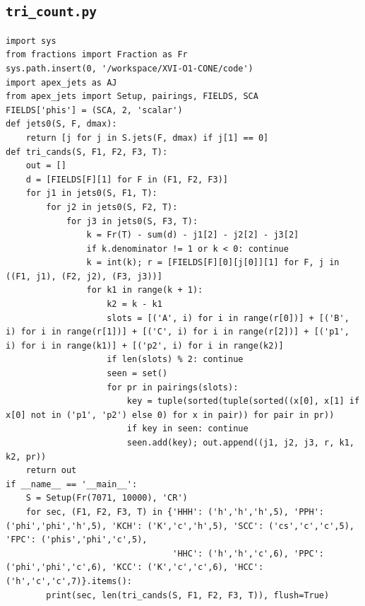 \documentclass[10pt]{article}
\begin{document}
\subsection{\texttt{tri\_count.py}}
\begin{lstlisting}
import sys
from fractions import Fraction as Fr
sys.path.insert(0, '/workspace/XVI-O1-CONE/code')
import apex_jets as AJ
from apex_jets import Setup, pairings, FIELDS, SCA
FIELDS['phis'] = (SCA, 2, 'scalar')
def jets0(S, F, dmax):
    return [j for j in S.jets(F, dmax) if j[1] == 0]
def tri_cands(S, F1, F2, F3, T):
    out = []
    d = [FIELDS[F][1] for F in (F1, F2, F3)]
    for j1 in jets0(S, F1, T):
        for j2 in jets0(S, F2, T):
            for j3 in jets0(S, F3, T):
                k = Fr(T) - sum(d) - j1[2] - j2[2] - j3[2]
                if k.denominator != 1 or k < 0: continue
                k = int(k); r = [FIELDS[F][0][j[0]][1] for F, j in ((F1, j1), (F2, j2), (F3, j3))]
                for k1 in range(k + 1):
                    k2 = k - k1
                    slots = [('A', i) for i in range(r[0])] + [('B', i) for i in range(r[1])] + [('C', i) for i in range(r[2])] + [('p1', i) for i in range(k1)] + [('p2', i) for i in range(k2)]
                    if len(slots) % 2: continue
                    seen = set()
                    for pr in pairings(slots):
                        key = tuple(sorted(tuple(sorted((x[0], x[1] if x[0] not in ('p1', 'p2') else 0) for x in pair)) for pair in pr))
                        if key in seen: continue
                        seen.add(key); out.append((j1, j2, j3, r, k1, k2, pr))
    return out
if __name__ == '__main__':
    S = Setup(Fr(7071, 10000), 'CR')
    for sec, (F1, F2, F3, T) in {'HHH': ('h','h','h',5), 'PPH': ('phi','phi','h',5), 'KCH': ('K','c','h',5), 'SCC': ('cs','c','c',5), 'FPC': ('phis','phi','c',5),
                                 'HHC': ('h','h','c',6), 'PPC': ('phi','phi','c',6), 'KCC': ('K','c','c',6), 'HCC': ('h','c','c',7)}.items():
        print(sec, len(tri_cands(S, F1, F2, F3, T)), flush=True)
\end{lstlisting}
\end{document}
